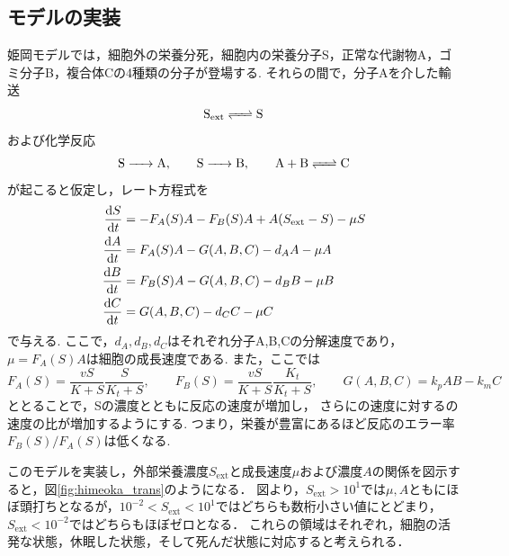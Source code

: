 \documentclass[a4paper,11pt]{jsarticle}
\begin{document}
\subsection{モデルの実装}
姫岡モデル\cite{himeoka}では，細胞外の栄養分死，細胞内の栄養分子S，正常な代謝物A，ゴミ分子B，複合体Cの4種類の分子が登場する.
それらの間で，分子Aを介した輸送
\begin{equation}
  \ce{S_{ext} <=> S}
\end{equation}
および化学反応
\begin{equation}
  \ce{S -> A},\qquad \ce{S -> B},\qquad \ce{A + B <=> C}
\end{equation}
が起こると仮定し，レート方程式を
\begin{align}
  \dv{S}{t} &= -F_A(S)A - F_B(S)A + A(S_{\mathrm{ext}}-S)-\mu S\\
  \dv{A}{t} &= F_A(S)A - G(A,B,C) - d_A A - \mu A\\
  \dv{B}{t} &= F_B(S) A - G(A,B,C) - d_B B - \mu B \\
  \dv{C}{t} &= G(A,B,C) - d_C C - \mu C
\end{align}
で与える.
ここで，$d_A,d_B,d_C$はそれぞれ分子A,B,Cの分解速度であり，$\mu=F_A(S)A$は細胞の成長速度である.
また，ここでは
\begin{equation}
  F_A(S) = \frac{vS}{K+S}\frac{S}{K_t+S},\qquad F_B(S) = \frac{vS}{K+S}\frac{K_t}{K_t+S},\qquad G(A,B,C) = k_p AB - k_m C
\end{equation}
ととることで，Sの濃度とともに反応の速度が増加し，
さらにの速度に対するの速度の比が増加するようにする.
つまり，栄養が豊富にあるほど反応のエラー率$F_B(S)/F_A(S)$は低くなる.

このモデルを実装し，外部栄養濃度$S_{\mathrm{ext}}$と成長速度$\mu$および濃度$A$の関係を図示すると，図\ref{fig:himeoka_trans}のようになる．
図より，$S_{\mathrm{ext}}> 10^1$では$\mu,A$ともにほぼ頭打ちとなるが，$10^{-2}<S_{\mathrm{ext}}<10^1$ではどちらも数桁小さい値にとどまり，$S_{\mathrm{ext}}<10^{-2}$ではどちらもほぼゼロとなる．
これらの領域はそれぞれ，細胞の活発な状態，休眠した状態，そして死んだ状態に対応すると考えられる．
\end{document}

